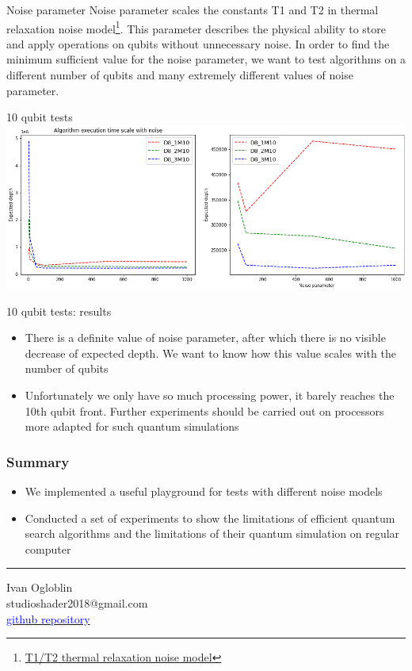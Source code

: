 \documentclass[14pt,aspectratio=169,hyperref={pdftex,unicode},xcolor=dvipsnames]{beamer}
\begin{document}
\begin{frame}{Noise parameter}
	Noise parameter scales the constants T1 and T2 in thermal relaxation noise model\footnote{\href{https://arxiv.org/pdf/2101.02109.pdf}{T1/T2 thermal relaxation noise model}}. This parameter describes the physical ability to store and apply operations on qubits without unnecessary noise. In order to find the minimum sufficient value for the noise parameter, we want to test algorithms on a different number of qubits and many extremely different values of noise parameter. 
\end{frame}

\begin{frame}{10 qubit tests}
	 \includegraphics[width=14cm]{images/10_qubit_tests.png}
\end{frame}

\begin{frame}{10 qubit tests: results}
	\begin{itemize}
		\item There is a definite value of noise parameter, after which there is no visible decrease of expected depth. We want to know how this value scales with the number of qubits
		\item Unfortunately we only have so much processing power, it barely reaches the 10th qubit front. Further experiments should be carried out on processors more adapted for such quantum simulations
	\end{itemize}
\end{frame}

\begin{frame}
\frametitle{Summary}

\begin{itemize}
\item We implemented a useful playground for tests with different noise models
\item Conducted a set of experiments to show the limitations of efficient quantum search algorithms and the limitations of their quantum simulation on regular computer
\end{itemize}

\vspace{5mm}\hrule\vspace{5mm}

\begin{center}
Ivan Ogloblin\\
studioshader2018@gmail.com \\
\href{https://github.com/StudioShader/QPSA}{\textcolor{blue}{github repository}}
\end{center}

\end{frame}
\end{document}
